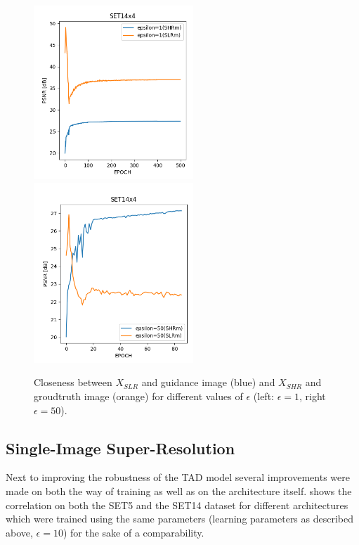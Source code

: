 \begin{figure}[!htbp]
	\centering
	\includegraphics[width=6cm]{figures/epsball_loss_1_set14}
  \includegraphics[width=6cm]{figures/epsball_loss_50_set14}
	\caption{Closeness between $X_{SLR}$ and guidance image (blue) and $X_{SHR}$
  and groudtruth image (orange) for different values of $\epsilon$ (left:
  $\epsilon = 1$, right $\epsilon = 50$).}
  \label{fig:epsball_loss}
\end{figure}

\subsection{Single-Image Super-Resolution}
\label{sec:Experiments_SISR}
Next to improving the robustness of the \ac{TAD} model several improvements
were made on both the way of training as well as on the architecture itself.
 shows the correlation on both the SET5
and the SET14 dataset for different architectures which were trained using the
same parameters (learning parameters as described above, $\epsilon = 10$) for
the sake of a comparability.

